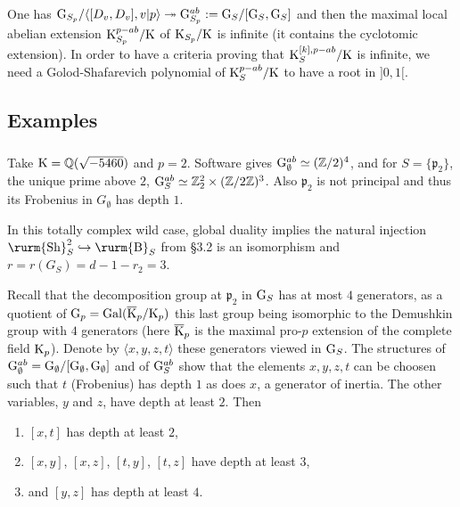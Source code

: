 \documentclass[12pt,a4paper,twoside,english]{smfart}
\def\Q{{\mathbb Q}}
\def\Z{{\mathbb Z}}
\def\p{{\mathfrak p}}
\def\sha{{{\textnormal{\rurm{Sh}}}}}
\def\CyB{{{\textnormal{\rurm{B}}}}}
\def\G{{\rm G}}
\def\K{{\rm K}}
\def\Gal{{\rm Gal}}
\begin{document}
  
\begin{rema}
 One has $\G_{S_p}/\langle [D_v,D_v], v|p \rangle \twoheadrightarrow \G_{S_p}^{ab}:=\G_S/[\G_S,\G_S]$ and then the maximal local abelian 
extension  $\K_{S_p}^{p-ab}/\K$ of $\K_{S_p}/\K$  is infinite (it contains the cyclotomic extension). In order to have a criteria proving that $\K_S^{{[k],p-ab}}/\K$ is infinite, we 
 need a Golod-Shafarevich polynomial of $\K_S^{p-ab}/\K$  to have a root in $]0,1[$. 
  \end{rema} 
 
  
\subsection{Examples}  \label{section:paragraph4.2}

\subsubsection{} Take $\K=\Q(\sqrt{-5460})$ and $p=2$. Software gives $\G^{ab}_\emptyset \simeq (\Z/2)^4$, and for $S=\{\p_2\}$, the unique prime above $2$,  
$\G_S^{ab} \simeq \Z_2^2 \times (\Z/2\Z)^3$.  Also $\p_2$ is not principal and thus its Frobenius in $G_\emptyset$ has depth $1$.

In this  totally complex wild case, global duality implies the natural injection $\sha^2_S \hookrightarrow \CyB_S$ from \S 3.2 is an isomorphism and
 $r= r(G_S) = d-1-r_2=3$.

 
 Recall  that the decomposition group at $\p_2$ in $\G_S$ has at most $4$ generators, as a quotient of $\G_\p=\Gal(\overline{\K}_\p/\K_\p)$  this last 
 group being isomorphic to the Demushkin group with $4$ generators (here $\overline{\K}_\p$ is the maximal pro-$p$ extension of the complete field $\K_\p$). Denote by $\langle x,y,z,t \rangle$ these generators viewed in $\G_S$.
 The structures of  $\G^{ab}_\emptyset=\G_\emptyset/[\G_\emptyset,\G_\emptyset]$ and of $\G_S^{ab}$  show that the elements $x,y,z,t$ can be choosen such that 
 $t$ (Frobenius) has depth $1$ as does $x$, a generator of inertia.  The other variables, $y$ and $z$,  have depth at least $2$.
 Then
 \begin{enumerate}
 \item[$\bullet$]  $[x,t]$ has depth at least $2$,
 \item[$\bullet$] $[x,y]$, $[x,z]$, $[t,y]$, $[t,z]$ have depth at least $3$,
 \item[$\bullet$]  and $[y,z]$ has depth at least $4$. 
 \end{enumerate}
 
\end{document}
